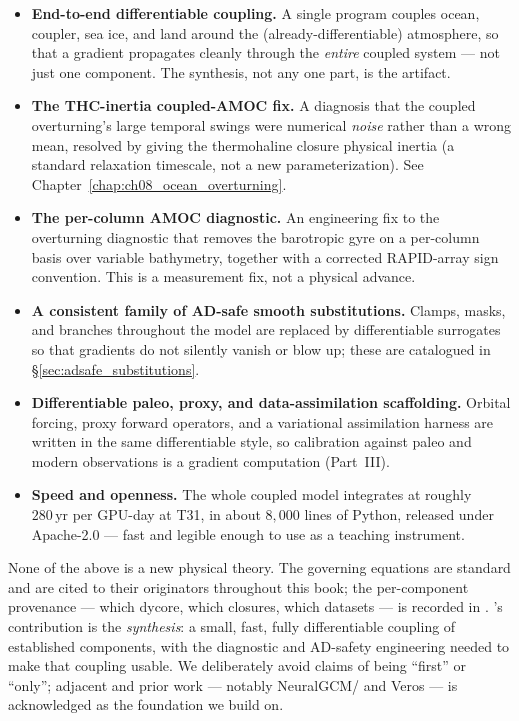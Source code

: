 \begin{itemize}[leftmargin=1.4em]
  \item \textbf{End-to-end differentiable coupling.} A single \jax{} program couples ocean,
    coupler, sea ice, and land around the (already-differentiable) \dino{} atmosphere, so that a
    gradient propagates cleanly through the \emph{entire} coupled system --- not just one
    component. The synthesis, not any one part, is the artifact.
  \item \textbf{The THC-inertia coupled-AMOC fix.} A diagnosis that the coupled overturning's
    large temporal swings were numerical \emph{noise} rather than a wrong mean, resolved by
    giving the thermohaline closure physical inertia (a standard relaxation timescale, not a new
    parameterization). See Chapter~\ref{chap:ch08_ocean_overturning}.
  \item \textbf{The per-column AMOC diagnostic.} An engineering fix to the overturning
    diagnostic that removes the barotropic gyre on a per-column basis over variable bathymetry,
    together with a corrected RAPID-array sign convention. This is a measurement fix, not a
    physical advance.
  \item \textbf{A consistent family of AD-safe smooth substitutions.} Clamps, masks, and
    branches throughout the model are replaced by differentiable surrogates so that gradients do
    not silently vanish or blow up; these are catalogued in \S\ref{sec:adsafe_substitutions}.
  \item \textbf{Differentiable paleo, proxy, and data-assimilation scaffolding.} Orbital
    forcing, proxy forward operators, and a variational assimilation harness are written in the
    same differentiable style, so calibration against paleo and modern observations is a
    gradient computation (Part~III).
  \item \textbf{Speed and openness.} The whole coupled model integrates at roughly
    $280\,\mathrm{yr}$ per GPU-day at T31, in about $8{,}000$ lines of Python, released under
    Apache-2.0 --- fast and legible enough to use as a teaching instrument.
\end{itemize}

\begin{remark}
None of the above is a new physical theory. The governing equations are standard and are cited
to their originators throughout this book; the per-component provenance --- which dycore, which
closures, which datasets --- is recorded in . \model{}'s contribution
is the \emph{synthesis}: a small, fast, fully differentiable coupling of established components,
with the diagnostic and AD-safety engineering needed to make that coupling usable. We
deliberately avoid claims of being ``first'' or ``only''; adjacent and prior work --- notably
NeuralGCM/\dino{} \citep{kochkov2024neuralgcm} and Veros \citep{hafner2018veros} --- is
acknowledged as the foundation we build on.
\end{remark}

